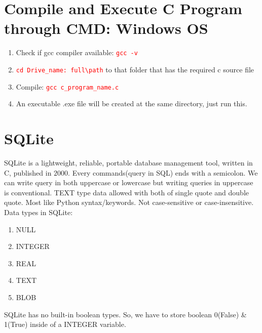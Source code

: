 \documentclass[12 pt, letterpaper]{extarticle}
\newcommand{\R}{\textcolor{red}} %
\newcommand{\T}{\texttt}
\begin{document}
\section*{Compile and Execute C Program through CMD: Windows OS}
\begin{enumerate}
	\item Check if gcc compiler available: \R{\T{gcc -v}}
	\item \R{\T{cd Drive\_name: full\textbackslash path}} to that folder that has the required c source file
	\item Compile: \R{\T{gcc c\_program\_name.c}}
	\item An executable .exe file will be created at the same directory, just run this.
\end{enumerate}

\section*{SQLite}
\justify
{
	SQLite is a lightweight, reliable, portable database management tool, written in C, published in $2000$. Every commands(query in SQL) ends with a semicolon. We can write query in both uppercase or lowercase but writing queries in uppercase is conventional. TEXT type data allowed with both of single quote and double quote. Most like Python syntax/keywords. Not case-sensitive or case-insensitive.\\
}
Data types in SQLite:
\begin{enumerate}
	\item NULL
	\item INTEGER
	\item REAL
	\item TEXT
	\item BLOB
\end{enumerate}
SQLite has no built-in boolean types. So, we have to store boolean 0(False) \& 1(True) inside of a INTEGER variable.\\
\end{document}
